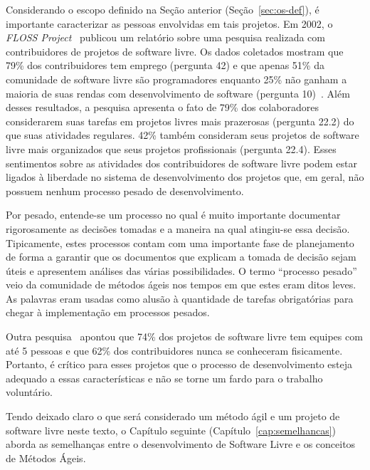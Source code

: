 Considerando o escopo definido na Seção anterior
(Seção~\ref{sec:os-def}), é importante caracterizar as pessoas
envolvidas em tais projetos. Em 2002, o \emph{FLOSS
  Project}~\cite{FlossProject} publicou um relatório sobre uma
pesquisa realizada com contribuidores de projetos de software
livre. Os dados coletados mostram que 79\% dos contribuidores tem
emprego (pergunta 42) e que apenas 51\% da comunidade de software
livre são programadores enquanto 25\% não ganham a maioria de suas
rendas com desenvolvimento de software (pergunta
10)~\cite{FlossStats}. Além desses resultados, a pesquisa apresenta o
fato de 79\% dos colaboradores considerarem suas tarefas em projetos
livres mais prazerosas (pergunta 22.2) do que suas atividades
regulares. 42\% também consideram seus projetos de software livre mais
organizados que seus projetos profissionais (pergunta 22.4).  Esses
sentimentos sobre as atividades dos contribuidores de software livre
podem estar ligados à liberdade no sistema de desenvolvimento dos
projetos que, em geral, não possuem nenhum processo pesado de
desenvolvimento.

Por pesado, entende-se um processo no qual é muito importante
documentar rigorosamente as decisões tomadas e a maneira na qual
atingiu-se essa decisão. Tipicamente, estes processos contam com uma
importante fase de planejamento de forma a garantir que os documentos
que explicam a tomada de decisão sejam úteis e apresentem análises das
várias possibilidades. O termo ``processo pesado'' veio da comunidade
de métodos ágeis nos tempos em que estes eram ditos leves. As palavras
eram usadas como alusão à quantidade de tarefas obrigatórias para
chegar à implementação em processos pesados.

Outra pesquisa~\cite{Reis2003} apontou que 74\% dos projetos de
software livre tem equipes com até 5 pessoas e que 62\% dos
contribuidores nunca se conheceram fisicamente. Portanto, é crítico
para esses projetos que o processo de desenvolvimento esteja adequado
a essas características e não se torne um fardo para o trabalho
voluntário.

Tendo deixado claro o que será considerado um método ágil e um projeto
de software livre neste texto, o Capítulo seguinte
(Capítulo~\ref{cap:semelhancas}) aborda as semelhanças entre o
desenvolvimento de Software Livre e os conceitos de Métodos Ágeis.

